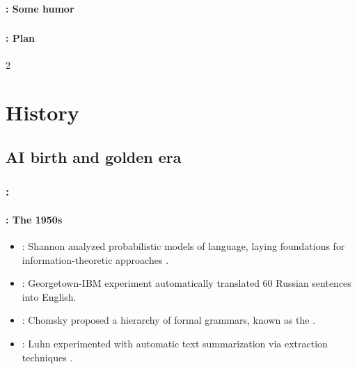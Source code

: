 \documentclass[xcolor=table]{beamer}
\begin{document}
\begin{frame}
	\frametitle{\inserttitle}
	\framesubtitle{\insertshortsubtitle: Some humor}
	
	\begin{center}
	\end{center}

\end{frame}

\begin{frame}
	\frametitle{\inserttitle}
	\framesubtitle{\insertshortsubtitle: Plan}
	
	\begin{multicols}{2}
		\tableofcontents
	\end{multicols}

\end{frame}

\section{History}

\begin{frame}
	\frametitle{\insertshortsubtitle}
	\framesubtitle{\insertsection}


\end{frame}

\subsection{AI birth and golden era}

\begin{frame}
	\frametitle{\insertshortsubtitle: \insertsection}
	\framesubtitle{\insertsubsection: The 1950s}

	\begin{itemize}
		\item {}: Shannon analyzed probabilistic models of language, laying foundations for information-theoretic approaches \cite{1951-shannon}.
		\item {}: Georgetown-IBM experiment automatically translated 60 Russian sentences into English.
		\item {}: Chomsky proposed a hierarchy of formal grammars, known as the .
		\item {}: Luhn experimented with automatic text summarization via extraction techniques \cite{1958-luhn}.
	\end{itemize}

\end{frame}
\end{document}
